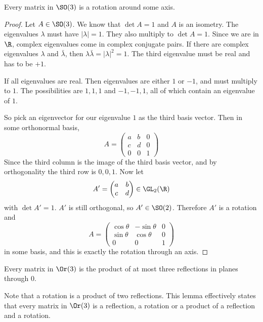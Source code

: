 \documentclass[a4paper]{article}
\begin{document}
\begin{lemma}
  Every matrix in $\SO(3)$ is a rotation around some axis.
\end{lemma}

\begin{proof}
  Let $A\in \SO(3)$. We know that $\det A = 1$ and $A$ is an isometry. The eigenvalues $\lambda$ must have $|\lambda| = 1$. They also multiply to $\det A = 1$. Since we are in $\R$, complex eigenvalues come in complex conjugate pairs. If there are complex eigenvalues $\lambda$ and $\bar\lambda$, then $\lambda\bar\lambda = |\lambda|^2 = 1$. The third eigenvalue must be real and has to be $+1$.

  If all eigenvalues are real. Then eigenvalues are either $1$ or $-1$, and must multiply to $1$. The possibilities are $1, 1, 1$ and $-1, -1, 1$, all of which contain an eigenvalue of $1$.

  So pick an eigenvector for our eigenvalue $1$ as the third basis vector. Then in some orthonormal basis,
  \[
    A = \begin{pmatrix}
      a & b & 0\\
      c & d & 0\\
      0 & 0 & 1
    \end{pmatrix}
  \]
  Since the third column is the image of the third basis vector, and by orthogonality the third row is $0, 0, 1$. Now let
  \[A' = \begin{pmatrix}
      a & b\\
      c & d
    \end{pmatrix} \in \GL_2(\R)
  \]
  with $\det A' = 1$. $A'$ is still orthogonal, so $A'\in \SO(2)$. Therefore $A'$ is a rotation and
  \[
    A =
    \begin{pmatrix}
      \cos\theta & -\sin\theta & 0\\
      \sin\theta & \cos\theta & 0\\
      0 & 0 & 1
    \end{pmatrix}
  \]
  in some basis, and this is exactly the rotation through an axis.
\end{proof}

\begin{lemma}
  Every matrix in $\Or(3)$ is the product of at most three reflections in planes through 0.
\end{lemma}
Note that a rotation is a product of two reflections. This lemma effectively states that every matrix in $\Or(3)$ is a reflection, a rotation or a product of a reflection and a rotation.
\end{document}
